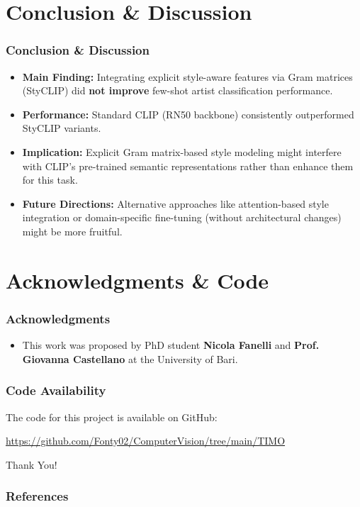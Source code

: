 \documentclass{beamer}
\begin{document}
\section{Conclusion \& Discussion}
\begin{frame}
  \frametitle{Conclusion \& Discussion}
  \begin{itemize}
    \item \textbf{Main Finding:} Integrating explicit style-aware features via Gram matrices (StyCLIP) did \textbf{not improve} few-shot artist classification performance.
    \item \textbf{Performance:} Standard CLIP (RN50 backbone) consistently outperformed StyCLIP variants.
    \item \textbf{Implication:} Explicit Gram matrix-based style modeling might interfere with CLIP's pre-trained semantic representations rather than enhance them for this task.
    \item \textbf{Future Directions:} Alternative approaches like attention-based style integration or domain-specific fine-tuning (without architectural changes) might be more fruitful.
  \end{itemize}
\end{frame}

\section{Acknowledgments \& Code}
\begin{frame}
  \frametitle{Acknowledgments}
  \begin{itemize}
    \item This work was proposed by PhD student \textbf{Nicola Fanelli} and \textbf{Prof. Giovanna Castellano} at the University of Bari.
  \end{itemize}
\end{frame}

\begin{frame}
  \frametitle{Code Availability}
  The code for this project is available on GitHub:
  \begin{center}
    \url{https://github.com/Fonty02/ComputerVision/tree/main/TIMO}
  \end{center}
  \vspace{2em}
  \begin{center}
    \Large Thank You!
    \vspace{1em}
  \end{center}
\end{frame}


\begin{frame}
    \frametitle{References}
    \tiny %
    
\end{frame}
\end{document}
